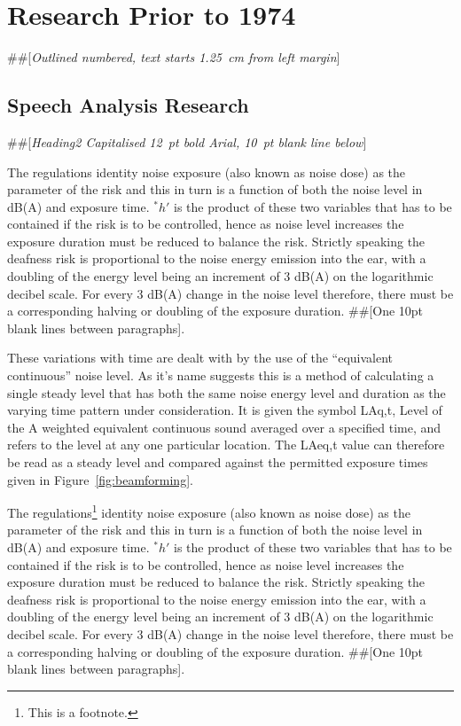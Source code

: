 \documentclass[10pt, a4paper, oneside]{article}
\begin{document}
\section{Research Prior to 1974}

\#\#[\textit{Outlined numbered, text starts 1.25~cm from left margin}]

\subsection{Speech Analysis Research}

\#\#[\textit{Heading2 Capitalised 12~pt bold Arial, 10~pt blank line below}]

The regulations identity noise exposure (also known as noise dose) as the parameter of the risk and this in turn is a function of both the noise level in dB(A) and exposure time. $^*h'$ is the product of these two variables that has to be contained if the risk is to be controlled, hence as noise level increases the exposure duration must be reduced to balance the risk. Strictly speaking the deafness risk is proportional to the noise energy emission into the ear, with a doubling of the energy level being an increment of 3 dB(A) on the logarithmic decibel scale. For every 3 dB(A) change in the noise level therefore, there must be a corresponding halving or doubling of the exposure duration. \#\#[One 10pt blank lines between paragraphs].

These variations with time are dealt with by the use of the ``equivalent continuous'' noise level. As it's name suggests this is a method of calculating a single steady level that has both the same noise energy level and duration as the varying time pattern under consideration. It is given the symbol LAq,t, Level of the A weighted equivalent continuous sound averaged over a specified time, and refers to the level at any one particular location. The LAeq,t value can therefore be read as a steady level and compared against the permitted exposure times given in Figure~\ref{fig:beamforming}.

\clearpage
The regulations\footnote{This is a footnote.} identity noise exposure (also known as noise dose) as the parameter of the risk and this in turn is a function of both the noise level in dB(A) and exposure time. $^*h'$ is the product of these two variables that has to be contained if the risk is to be controlled, hence as noise level increases the exposure duration must be reduced to balance the risk. Strictly speaking the deafness risk is proportional to the noise energy emission into the ear, with a doubling of the energy level being an increment of 3 dB(A) on the logarithmic decibel scale. For every 3 dB(A) change in the noise level therefore, there must be a corresponding halving or doubling of the exposure duration. \#\#[One 10pt blank lines between paragraphs].
\end{document}

